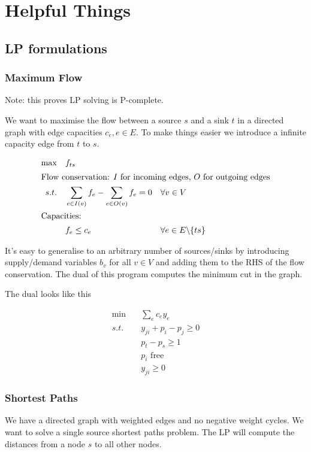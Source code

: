\appendix
\chapter{Helpful Things}
\section{LP formulations}
\subsection{Maximum Flow}
Note: this proves LP solving is P-complete.

We want to maximise the flow between a source $s$ and a sink $t$ in a directed graph with edge capacities $c_e, e\in E$. To make things easier we introduce a infinite capacity edge from $t$ to $s$.

\begin{align*}
\max \quad & f_{ts}\\
\intertext{Flow conservation: $I$ for incoming edges, $O$ for outgoing edges}
s.t.\quad	& \sum_{e\in I(v)} f_e - \sum_{e\in O(v)} f_e = 0 && \forall v\in V\\
\intertext{Capacities:}
	& f_e \leq c_e && \forall e \in E\backslash \{ts\}\\
\end{align*}

It's easy to generalise to an arbitrary number of sources/sinks by introducing supply/demand variables $b_v$ for all $v\in V$ and adding them to the RHS of the flow conservation. The dual of this program computes the minimum cut in the graph.

The dual looks like this

\begin{align*}
\min \quad & \sum_e c_ey_e\\
s.t.\quad	& y_{ji} + p_i - p_j \geq 0\\
	& p_t - p_s \geq 1\\
	& p_i \text{ free}\\
	& y_{ji} \geq 0
\end{align*}

\subsection{Shortest Paths}

We have a directed graph with weighted edges and no negative weight cycles. We want to solve a single source shortest paths problem. The LP will compute the distances from a node $s$ to all other nodes.

